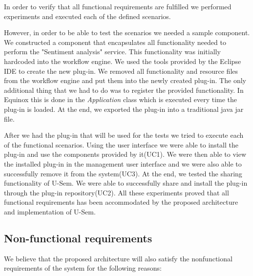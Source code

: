 In order to verify that all functional requirements are fulfilled we performed experiments and executed each of the defined scenarios.
 
However, in order to be able to test the scenarios we needed a sample component. We constructed a component that encapsulates all functionality needed to perform the "Sentiment analysis" service. This functionality was initially hardcoded into the workflow engine. We used the tools provided by the Eclipse IDE to create the new plug-in. We removed all functionality and resource files from the workflow engine and put them into the newly created plug-in. The only additional thing that we had to do was to register the provided functionality. In Equinox this is done in the \textit{Application} class which is executed every time the plug-in is loaded. At the end, we exported the plug-in into a traditional java jar file.

After we had the plug-in that will be used for the tests we tried to execute each of the functional scenarios. Using the user interface we were able to install the plug-in and use the components provided by it(UC1). We were then able to view the installed plug-in in the management user interface and we were also able to successfully remove it from the system(UC3). At the end, we tested the sharing functionality of U-Sem. We were able to successfully share and install the plug-in through the plug-in repository(UC2). All these experiments proved that all functional requirements has been accommodated by the proposed architecture and implementation of U-Sem.


\subsection{Non-functional requirements}

We believe that the proposed architecture will also satisfy the nonfunctional requirements of the system for the following reasons:

